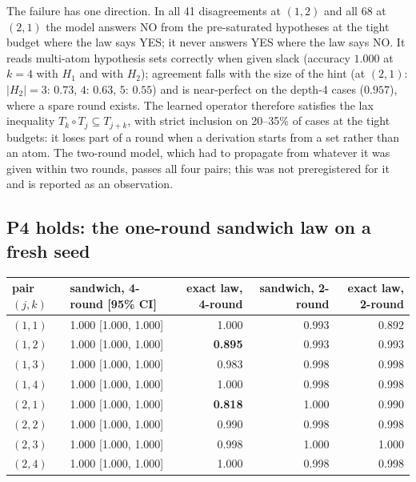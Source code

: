 The failure has one direction. In all 41 disagreements at \((1,2)\) and all 68 at \((2,1)\) the model answers NO from the pre-saturated hypotheses at the tight budget where the law says YES; it never answers YES where the law says NO. It reads multi-atom hypothesis sets correctly when given slack (accuracy \(1.000\) at \(k=4\) with \(H_1\) and with \(H_2\)); agreement falls with the size of the hint (at \((2,1)\): \(|H_2|=3\): \(0.73\), \(4\): \(0.63\), \(5\): \(0.55\)) and is near-perfect on the depth-4 cases (\(0.957\)), where a spare round exists. The learned operator therefore satisfies the lax inequality \(T_k\circ T_j\subseteq T_{j+k}\), with strict inclusion on 20--35\% of cases at the tight budgets: it loses part of a round when a derivation starts from a set rather than an atom. The two-round model, which had to propagate from whatever it was given within two rounds, passes all four pairs; this was not preregistered for it and is reported as an observation.

\subsection{P4 holds: the one-round sandwich law on a fresh seed}\label{p4-holds-the-one-round-sandwich-law-on-a-fresh-seed}

{\def\LTcaptype{none} %
\begin{longtable}[]{@{}llrrr@{}}
\toprule\noalign{}
pair \((j,k)\) & sandwich, 4-round {[}95\% CI{]} & exact law, 4-round & sandwich, 2-round & exact law, 2-round \\
\midrule\noalign{}
\endhead
\bottomrule\noalign{}
\endlastfoot
\((1,1)\) & 1.000 {[}1.000, 1.000{]} & 1.000 & 0.993 & 0.892 \\
\((1,2)\) & 1.000 {[}1.000, 1.000{]} & \textbf{0.895} & 0.993 & 0.993 \\
\((1,3)\) & 1.000 {[}1.000, 1.000{]} & 0.983 & 0.998 & 0.998 \\
\((1,4)\) & 1.000 {[}1.000, 1.000{]} & 1.000 & 0.998 & 0.998 \\
\((2,1)\) & 1.000 {[}1.000, 1.000{]} & \textbf{0.818} & 1.000 & 0.990 \\
\((2,2)\) & 1.000 {[}1.000, 1.000{]} & 0.990 & 0.998 & 0.998 \\
\((2,3)\) & 1.000 {[}1.000, 1.000{]} & 0.998 & 1.000 & 1.000 \\
\((2,4)\) & 1.000 {[}1.000, 1.000{]} & 1.000 & 0.998 & 0.998 \\
\end{longtable}
}

